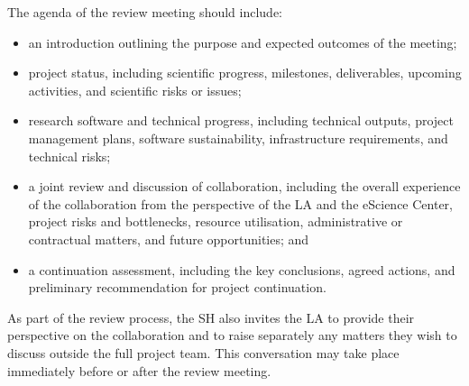 The agenda of the review meeting should include:
\vspace{-0.2cm}
\begin{itemize}
 \item an introduction outlining the purpose and expected outcomes of the meeting;
 \item project status, including scientific progress, milestones, deliverables, upcoming activities, and scientific
 risks or issues;
 \item research software and technical progress, including technical outputs, project management plans, software
 sustainability, infrastructure requirements, and technical risks;
 \item a joint review and discussion of collaboration, including the overall experience of the collaboration from the
 perspective of the LA and the eScience Center, project risks and bottlenecks, resource utilisation,
 administrative or contractual matters, and future opportunities; and
 \item a continuation assessment, including the key conclusions, agreed actions, and preliminary recommendation for
 project continuation.
\end{itemize}
\vspace{-0.2cm}

As part of the review process, the SH also invites the LA to provide their perspective on the collaboration and to 
raise separately any matters they wish to discuss outside the full project team. This conversation may take place 
immediately before or after the review meeting.

